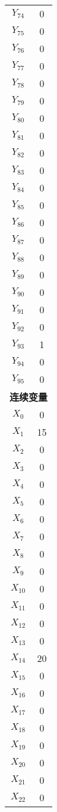 \documentclass[a4paper,10pt]{article}
\begin{document}
\begin{center}
\begin{longtable}{cc}
$Y_{74}$ & 0 \\
$Y_{75}$ & 0 \\
$Y_{76}$ & 0 \\
$Y_{77}$ & 0 \\
$Y_{78}$ & 0 \\
$Y_{79}$ & 0 \\
$Y_{80}$ & 0 \\
$Y_{81}$ & 0 \\
$Y_{82}$ & 0 \\
$Y_{83}$ & 0 \\
$Y_{84}$ & 0 \\
$Y_{85}$ & 0 \\
$Y_{86}$ & 0 \\
$Y_{87}$ & 0 \\
$Y_{88}$ & 0 \\
$Y_{89}$ & 0 \\
$Y_{90}$ & 0 \\
$Y_{91}$ & 0 \\
$Y_{92}$ & 0 \\
$Y_{93}$ & 1 \\
$Y_{94}$ & 0 \\
$Y_{95}$ & 0 \\
\midrule
\multicolumn{2}{c}{\textbf{连续变量}} \\
\midrule
$X_{0}$ & 0 \\
$X_{1}$ & 15 \\
$X_{2}$ & 0 \\
$X_{3}$ & 0 \\
$X_{4}$ & 0 \\
$X_{5}$ & 0 \\
$X_{6}$ & 0 \\
$X_{7}$ & 0 \\
$X_{8}$ & 0 \\
$X_{9}$ & 0 \\
$X_{10}$ & 0 \\
$X_{11}$ & 0 \\
$X_{12}$ & 0 \\
$X_{13}$ & 0 \\
$X_{14}$ & 20 \\
$X_{15}$ & 0 \\
$X_{16}$ & 0 \\
$X_{17}$ & 0 \\
$X_{18}$ & 0 \\
$X_{19}$ & 0 \\
$X_{20}$ & 0 \\
$X_{21}$ & 0 \\
$X_{22}$ & 0 \\

\end{longtable}
\end{center}
\end{document}
